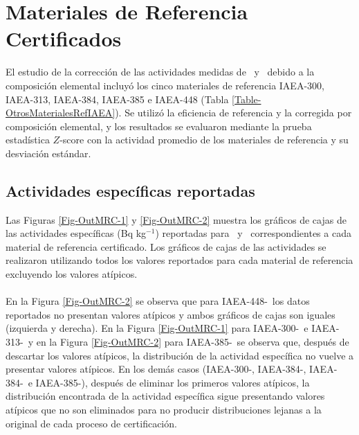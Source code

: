 \chapter{Materiales de Referencia Certificados}\label{ApexMRC}
\lettrine{E}{}l estudio de la corrección de las actividades medidas de \PbCero\, y \PbCuatro\, debido a la composición elemental incluyó los cinco materiales de referencia IAEA-300, IAEA-313, IAEA-384, IAEA-385 e IAEA-448 (Tabla \ref{Table-OtrosMaterialesRefIAEA}). Se utilizó la eficiencia de referencia y la corregida por composición elemental, y los resultados se evaluaron mediante la prueba estadística $Z$-score con la actividad promedio de los materiales de referencia y su desviación estándar.
\section{Actividades específicas reportadas}
Las Figuras \ref{Fig-OutMRC-1} y \ref{Fig-OutMRC-2} muestra los gráficos de cajas de las actividades específicas (Bq kg$^{-1}$) reportadas para \PbCero\, y \PbCuatro\, correspondientes a cada material de referencia certificado. Los gráficos de cajas de las actividades se realizaron utilizando todos los valores reportados para cada material de referencia excluyendo los valores atípicos. 
\\
\\
En la Figura \ref{Fig-OutMRC-2} se observa que para IAEA-448-\PbCuatro\, los datos reportados no presentan valores atípicos y ambos gráficos de cajas son iguales (izquierda y derecha). En la Figura \ref{Fig-OutMRC-1} para IAEA-300-\PbCero\, e IAEA-313-\PbCuatro\, y en la Figura \ref{Fig-OutMRC-2} para IAEA-385-\PbCero\, se observa que, después de descartar los valores atípicos, la distribución de la actividad específica no vuelve a presentar valores atípicos. En los demás casos (IAEA-300-\PbCuatro, IAEA-384-\PbCero, IAEA-384-\PbCuatro\, e IAEA-385-\PbCuatro), después de eliminar los primeros valores atípicos, la distribución encontrada de la actividad específica sigue presentando valores atípicos que no son eliminados para no producir distribuciones lejanas a la original de cada proceso de certificación.
